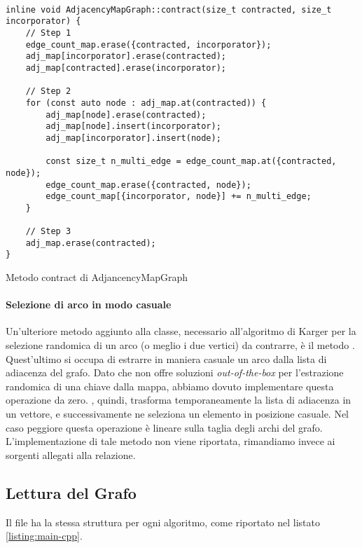 \begin{listing}[!ht]
\begin{verbatim}

inline void AdjacencyMapGraph::contract(size_t contracted, size_t incorporator) {
    // Step 1
    edge_count_map.erase({contracted, incorporator});
    adj_map[incorporator].erase(contracted);
    adj_map[contracted].erase(incorporator);

    // Step 2
    for (const auto node : adj_map.at(contracted)) {
        adj_map[node].erase(contracted);
        adj_map[node].insert(incorporator);
        adj_map[incorporator].insert(node);

        const size_t n_multi_edge = edge_count_map.at({contracted, node});
        edge_count_map.erase({contracted, node});
        edge_count_map[{incorporator, node}] += n_multi_edge;
    }

    // Step 3
    adj_map.erase(contracted);
}
\end{verbatim}
\caption{Metodo contract di AdjancencyMapGraph}
\label{listing:met-contract}
\end{listing}

\paragraph{Selezione di arco in modo casuale}
Un'ulteriore metodo aggiunto alla classe, necessario all'algoritmo di
Karger per la selezione randomica di un arco (o meglio i due vertici)
da contrarre, è il metodo .
Quest'ultimo si occupa di estrarre in maniera casuale un arco dalla
lista di adiacenza del grafo. Dato che
 non offre soluzioni
\emph{out-of-the-box} per l'estrazione randomica di una chiave dalla
mappa, abbiamo dovuto implementare questa operazione da
zero. , quindi, trasforma
temporaneamente la lista di adiacenza in un vettore, e successivamente
ne seleziona un elemento in posizione casuale. Nel caso peggiore
questa operazione è lineare sulla taglia degli archi del
grafo. L'implementazione di tale metodo non viene riportata,
rimandiamo invece ai sorgenti allegati alla relazione.

\subsection{Lettura del Grafo}

\noindent Il file  ha la stessa struttura per
ogni algoritmo, come riportato nel listato \ref{listing:main-cpp}.

